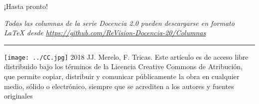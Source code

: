 \documentclass[twoside,10pt]{article}
\newcommand{\surl}[1]{{\small\url{#1}}}
\begin{document}
\begin{multicols}{2}
\smallskip

\noindent ¡Hasta pronto!

\medskip

\noindent\emph{Todas las columnas de la serie Docencia 2.0
pueden descargarse en formato LaTeX desde
\surl{https://github.com/ReVision-Docencia-20/Columnas}}

\noindent\rule{90mm}{1pt}

{\small \noindent\texttt{[image: ../CC.jpg]} 2018 JJ.
Merelo, F. Tricas. Este artículo es de acceso libre distribuido bajo
los términos
de la Licencia Creative Commons de Atribución, que permite copiar,
distribuir y comunicar públicamente la obra en cualquier medio, sólido
o electrónico, siempre que se acrediten a los autores y fuentes
originales}

\end{multicols}
\end{document}
